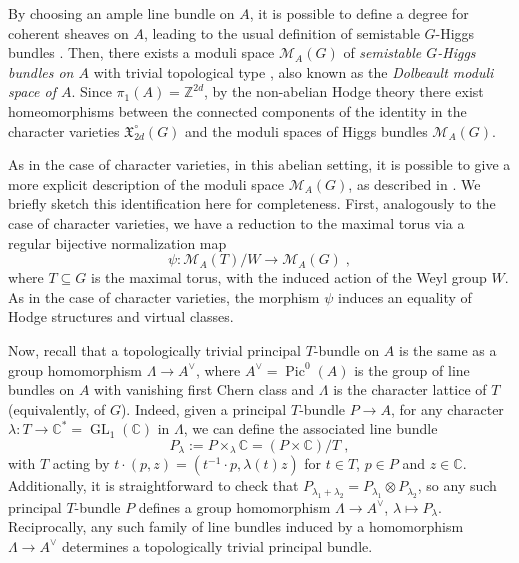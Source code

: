 \documentclass[11pt,english]{amsart}
\numberwithin{equation}{section}
\numberwithin{figure}{section}
\theoremstyle{plain}
\theoremstyle{plain}
\theoremstyle{definition}
\theoremstyle{remark}
\newcommand{\CC}{\mathbb{C}}
\newcommand{\Pic}{\operatorname{Pic}}
\newcommand{\GL}{\operatorname{GL}}
\begin{document}
By choosing an ample line bundle on $A$, it is possible to define a degree for
coherent sheaves on $A$, leading to the usual definition of semistable $G$-Higgs bundles
\cite{ramanathan1975moduli, simpson1994moduli1}. Then, there exists a moduli space $\mathcal{M}_{A}(G)$ of
\emph{semistable $G$-Higgs bundles on $A$} with trivial topological type \cite{simpson1994moduli2, simpson1995moduli2}, also known as the \emph{Dolbeault moduli space of $A$}. Since $\pi_{1}(A)=\mathbb{Z}^{2d}$, by the non-abelian
Hodge theory \cite{corlette1988flat, hitchin1987self, simpson1992higgs} there exist homeomorphisms between the connected components of the identity in the character
varieties $\mathfrak{X}_{2d}^\circ(G)$ and the moduli spaces of Higgs
bundles $\mathcal{M}_{A}(G)$.

As in the case of character varieties, in this abelian setting, it is possible to give a more explicit description of the moduli space $\mathcal{M}_A(G)$, as described in \cite{florentino2013commuting, franco2014higgs, franco2019higgs, BFN}. We briefly sketch this identification here for completeness. First, analogously to the case of character varieties, we have a reduction to the maximal torus via a regular bijective normalization map
$$
    \psi: \mathcal{M}_A(T)/W \to \mathcal{M}_A(G)\; ,
$$
where $T \subseteq G$ is the maximal torus, with the induced action of the Weyl group $W$. As in the case of character varieties, the morphism $\psi$ induces an equality of Hodge structures and virtual classes.

Now, recall that a topologically trivial principal $T$-bundle on $A$ is the same as a group homomorphism $\Lambda \to A^\vee$, where $A^\vee = \Pic^0(A)$ is the group of line bundles on $A$ with vanishing first Chern class and $\Lambda$ is the character lattice of $T$ (equivalently, of $G$). Indeed, given a principal $T$-bundle $P \to A$, for any character $\lambda: T \to \CC^* = \GL_1(\CC)$ in $\Lambda$, we can define the associated line bundle
$$
    P_\lambda := P \times_{\lambda} \CC = (P \times \CC)/T\; ,
$$
with $T$ acting by $t \cdot (p, z) = (t^{-1} \cdot p, \lambda(t)z)$ for $t \in T$, $p \in P$ and $z \in \CC$. Additionally, it is straightforward to check that $P_{\lambda_1 + \lambda_2} = P_{\lambda_1} \otimes P_{\lambda_2}$, so any such principal $T$-bundle $P$ defines a group homomorphism $\Lambda \to A^\vee$, $\lambda \mapsto P_\lambda$. Reciprocally, any such family of line bundles induced by a homomorphism $\Lambda \to A^\vee$ determines a topologically trivial principal bundle.
\end{document}
